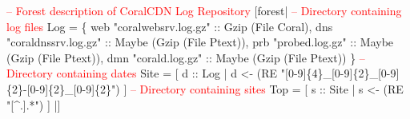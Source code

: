 \begin{code}
\textcolor{red}{-- Forest description of CoralCDN Log Repository}
[forest|
  \textcolor{red}{-- Directory containing log files}
   Log = 
    \{ web  "coralwebsrv.log.gz" :: Gzip (File Coral),          
      dns  "coraldnssrv.log.gz" :: Maybe (Gzip (File Ptext)),
      prb  "probed.log.gz"      :: Maybe (Gzip (File Ptext)),
      dmn  "corald.log.gz"      :: Maybe (Gzip (File Ptext)) \}
\mbox{}
  \textcolor{red}{-- Directory containing dates}
   Site = [ d :: Log | d <-  (RE "[0-9]\{4\}\_[0-9]\{2\}\_[0-9]\{2\}-[0-9]\{2\}\_[0-9]\{2\}") ] 
\mbox{}
  \textcolor{red}{-- Directory containing sites}
   Top = [ s :: Site | s <-  (RE "[^.].*") ] 
|]
\end{code}

